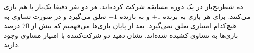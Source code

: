 \EXERCISE
ده شطرنج‌باز در یک دوره مسابقه شرکت کرده‌اند. هر دو نفر دقیقا یک‌بار با هم بازی می‌کنند. برای هر بازی به برنده
$+1$
و به بازنده
$-1$
تعلق می‌گیرد و در صورت تساوی به هیچ‌کدام امتیازی تعلق نمی‌گیرد. بعد از پایان بازی‌ها می‌فهمیم که بیش از
$70$
درصد بازی‌ها به تساوی کشیده شده‌اند. نشان دهید دو شرکت‌کننده با امتیاز مساوی وجود دارند.